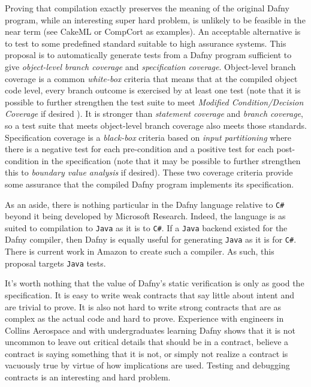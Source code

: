 \documentclass[11pt,onecolumn,notitlepage]{article}
\begin{document}
Proving that compilation exactly preserves the meaning of the original Dafny program, while an interesting super hard problem, is unlikely to be feasible in the near term (see CakeML or CompCort as examples). An acceptable alternative is to test to some predefined standard suitable to high assurance systems. This proposal is to automatically generate tests from a Dafny program sufficient to give \emph{object-level branch coverage} and \emph{specification coverage}. Object-level branch coverage is a common \emph{white-box} criteria that means that at the compiled object code level, every branch outcome is exercised by at least one test (note that it is possible to further strengthen the test suite to meet \emph{Modified Condition/Decision Coverage} if desired \cite{7194601}). It is stronger than \emph{statement coverage} and \emph{branch coverage}, so a test suite that meets object-level branch coverage also meets those standards. Specification coverage is a \emph{black-box} criteria based on \emph{input partitioning} where there is a negative test for each pre-condition and a positive test for each post-condition in the specification (note that it may be possible to further strengthen this to \emph{boundary value analysis} if desired). These two coverage criteria provide some assurance that the compiled Dafny program implements its specification.

As an aside, there is nothing particular in the Dafny language relative to \texttt{C\#} beyond it being developed by Microsoft Research. Indeed, the language is as suited to compilation to \texttt{Java} as it is to \texttt{C\#}. If a \texttt{Java} backend existed for the Dafny compiler, then Dafny is equally useful for generating \texttt{Java} as it is for \texttt{C\#}. There is current work in Amazon to create such a compiler. As such, this proposal targets \texttt{Java} tests.

It's worth nothing that the value of Dafny's static verification is only as good the specification. It is easy to write weak contracts that say little about intent and are trivial to prove. It is also not hard to write strong contracts that are as complex as the actual code and hard to prove. Experience with engineers in Collins Aerospace and with undergraduates learning Dafny shows that it is not uncommon to leave out critical details that should be in a contract, believe a contract is saying something that it is not, or simply not realize a contract is vacuously true by virtue of how implications are used. Testing and debugging contracts is an interesting and hard problem. 
\end{document}
